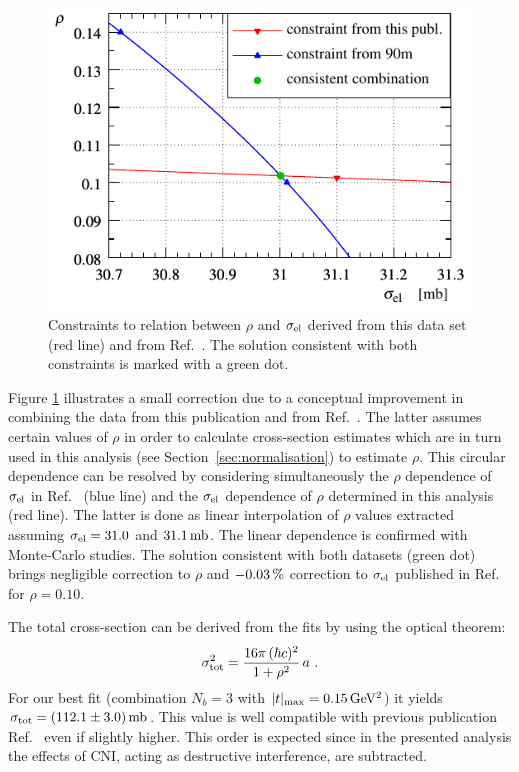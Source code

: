 \begin{figure}
\vskip-5mm
\begin{center}
\includegraphics{fig/si_el_rho_solution.pdf}
\caption{%
Constraints to relation between $\rho$ and $\sigma_{\rm el}$ derived from this data set (red line) and from Ref.~\cite{totem-13tev-90m}. The solution consistent with both constraints is marked with a green dot.
}
\label{fig:si_el rho sol}
\end{center}
\end{figure}


Figure \ref{fig:si_el rho sol} illustrates a small correction due to a conceptual improvement in combining the data from this publication and from Ref.~\cite{totem-13tev-90m}. The latter assumes certain values of $\rho$ in order to calculate cross-section estimates which are in turn used in this analysis (see Section~\ref{sec:normalisation}) to estimate $\rho$. This circular dependence can be resolved by considering simultaneously the $\rho$ dependence of $\sigma_{\rm el}$ in Ref.~\cite{totem-13tev-90m} (blue line) and the $\sigma_{\rm el}$ dependence of $\rho$ determined in this analysis (red line). The latter is done as linear interpolation of $\rho$ values extracted assuming $\sigma_{\rm el} = 31.0$ and $31.1\,{\rm mb}$. The linear dependence is confirmed with Monte-Carlo studies. The solution consistent with both datasets (green dot) brings negligible correction to $\rho$ and $-0.03\,{\rm \%}$ correction to $\sigma_{\rm el}$ published in Ref.~\cite{totem-13tev-90m} for $\rho=0.10$.



The total cross-section can be derived from the fits by using the optical theorem:
\begin{equation}
\label{eq:si tot}
\sigma_{\rm tot}^2 = {16\pi\, (\hbar c)^2\over 1 + \rho^2}\, a\ .
\end{equation}
For our best fit (combination $N_b=3$ with $|t|_{\rm max} = 0.15\,{\rm GeV^2}$) it yields $\sigma_{\rm tot} = (112.1 \pm 3.0)\,{\rm mb}$. This value is well compatible with previous publication Ref.~\cite{totem-13tev-90m} even if slightly higher. This order is expected since in the presented analysis the effects of CNI, acting as destructive interference, are subtracted.
